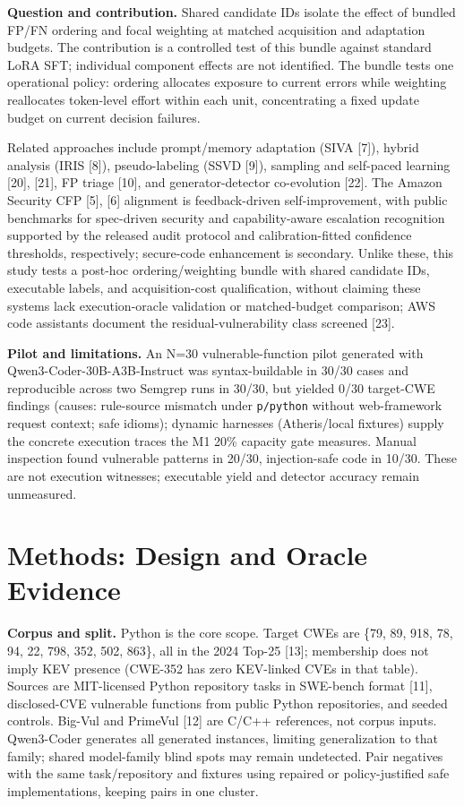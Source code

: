 \documentclass[11pt]{article}
\begin{document}
\textbf{Question and contribution.} Shared candidate IDs isolate the effect of bundled FP/FN ordering and focal weighting at matched acquisition and adaptation budgets. The contribution is a controlled test of this bundle against standard LoRA SFT; individual component effects are not identified. The bundle tests one operational policy: ordering allocates exposure to current errors while weighting reallocates token-level effort within each unit, concentrating a fixed update budget on current decision failures.

Related approaches include prompt/memory adaptation (SIVA [7]), hybrid analysis (IRIS [8]), pseudo-labeling (SSVD [9]), sampling and self-paced learning [20], [21], FP triage [10], and generator-detector co-evolution [22]. The Amazon Security CFP [5], [6] alignment is feedback-driven self-improvement, with public benchmarks for spec-driven security and capability-aware escalation recognition supported by the released audit protocol and calibration-fitted confidence thresholds, respectively; secure-code enhancement is secondary. Unlike these, this study tests a post-hoc ordering/weighting bundle with shared candidate IDs, executable labels, and acquisition-cost qualification, without claiming these systems lack execution-oracle validation or matched-budget comparison; AWS code assistants document the residual-vulnerability class screened [23].

\textbf{Pilot and limitations.} An N=30 vulnerable-function pilot generated with Qwen3-Coder-30B-A3B-Instruct was syntax-buildable in 30/30 cases and reproducible across two Semgrep runs in 30/30, but yielded 0/30 target-CWE findings (causes: rule-source mismatch under \texttt{p/python} without web-framework request context; safe idioms); dynamic harnesses (Atheris/local fixtures) supply the concrete execution traces the M1 20\% capacity gate measures. Manual inspection found vulnerable patterns in 20/30, injection-safe code in 10/30. These are not execution witnesses; executable yield and detector accuracy remain unmeasured.

\section*{Methods: Design and Oracle Evidence}
\textbf{Corpus and split.} Python is the core scope. Target CWEs are \{79, 89, 918, 78, 94, 22, 798, 352, 502, 863\}, all in the 2024 Top-25 [13]; membership does not imply KEV presence (CWE-352 has zero KEV-linked CVEs in that table). Sources are MIT-licensed Python repository tasks in SWE-bench format [11], disclosed-CVE vulnerable functions from public Python repositories, and seeded controls. Big-Vul and PrimeVul [12] are C/C++ references, not corpus inputs. Qwen3-Coder generates all generated instances, limiting generalization to that family; shared model-family blind spots may remain undetected. Pair negatives with the same task/repository and fixtures using repaired or policy-justified safe implementations, keeping pairs in one cluster.
\end{document}
